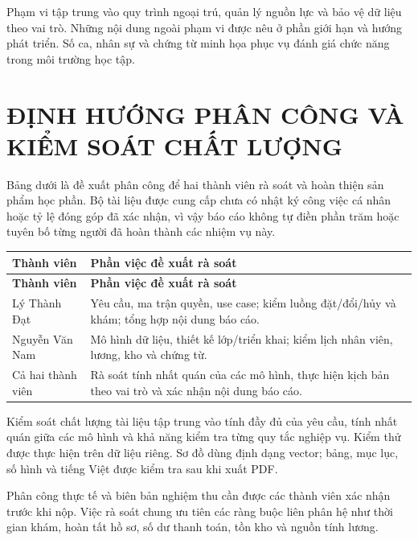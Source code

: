 Phạm vi tập trung vào quy trình ngoại trú, quản lý nguồn lực và bảo vệ dữ liệu theo vai trò.\allowbreak{} Những nội dung ngoài phạm vi được nêu ở phần giới hạn và hướng phát triển.\allowbreak{} Số ca, nhân sự và chứng từ minh họa phục vụ đánh giá chức năng trong môi trường học tập.\allowbreak{}

\clearpage
\chapter*{ĐỊNH HƯỚNG PHÂN CÔNG VÀ KIỂM SOÁT CHẤT LƯỢNG}
Bảng dưới là đề xuất phân công để hai thành viên rà soát và hoàn thiện sản phẩm học phần.\allowbreak{} Bộ tài liệu được cung cấp chưa có nhật ký công việc cá nhân hoặc tỷ lệ đóng góp đã xác nhận, vì vậy báo cáo không tự điền phần trăm hoặc tuyên bố từng người đã hoàn thành các nhiệm vụ này.\allowbreak{}


{\small\setlength{\tabcolsep}{3pt}\renewcommand{\arraystretch}{1.12}
\begin{longtable}{@{}L{\textwidth-1.62pt\relax} L{\textwidth-4.38pt\relax}@{}}
\toprule
\textbf{Thành viên} & \textbf{Phần việc đề xuất rà soát}\\\midrule
\endfirsthead
\toprule
\textbf{Thành viên} & \textbf{Phần việc đề xuất rà soát}\\\midrule
\endhead
\bottomrule\endlastfoot
Lý Thành Đạt & Yêu cầu, ma trận quyền, use case; kiểm luồng đặt/\allowbreak{}đổi/\allowbreak{}hủy và khám; tổng hợp nội dung báo cáo.\allowbreak{}\\[3pt]
Nguyễn Văn Nam & Mô hình dữ liệu, thiết kế lớp/\allowbreak{}triển khai; kiểm lịch nhân viên, lương, kho và chứng từ.\allowbreak{}\\[3pt]
Cả hai thành viên & Rà soát tính nhất quán của các mô hình, thực hiện kịch bản theo vai trò và xác nhận nội dung báo cáo.\allowbreak{}\\[3pt]
\end{longtable}}
Kiểm soát chất lượng tài liệu tập trung vào tính đầy đủ của yêu cầu, tính nhất quán giữa các mô hình và khả năng kiểm tra từng quy tắc nghiệp vụ.\allowbreak{} Kiểm thử được thực hiện trên dữ liệu riêng.\allowbreak{} Sơ đồ dùng định dạng vector; bảng, mục lục, số hình và tiếng Việt được kiểm tra sau khi xuất PDF.\allowbreak{}

Phân công thực tế và biên bản nghiệm thu cần được các thành viên xác nhận trước khi nộp.\allowbreak{} Việc rà soát chung ưu tiên các ràng buộc liên phân hệ như thời gian khám, hoàn tất hồ sơ, số dư thanh toán, tồn kho và nguồn tính lương.\allowbreak{}

